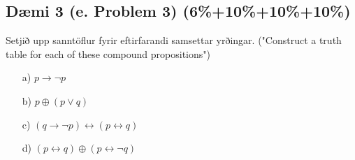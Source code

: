 \newpage
\subsection*{Dæmi 3 (e. Problem 3) (6\%+10\%+10\%+10\%)\label{section:daemi3}}
Setjið upp sanntöflur fyrir eftirfarandi samsettar yrðingar. ("Construct a truth table for each of these compound propositions")
\begin{multicols}{2}
    \begin{itemize}
        \item [a)] $p \to \neg p$
        \item [b)] $p \oplus (p \lor q)$
        \item [c)] $(q \to \neg p)\leftrightarrow (p \leftrightarrow q)$
        \item [d)] $(p \leftrightarrow q)\oplus (p \leftrightarrow \neg q)$
    \end{itemize}
\end{multicols}
